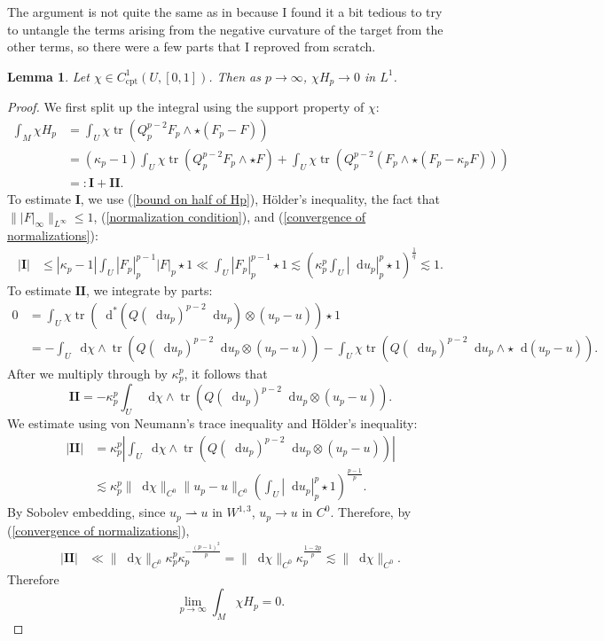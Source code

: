 \documentclass[reqno,11pt]{amsart}
\newcommand*\dif{\mathop{}\!\mathrm{d}}
\DeclareMathOperator{\tr}{tr}
\newcommand{\cpt}{\mathrm{cpt}}
\newtheorem{lemma}[theorem]{Lemma}
\newcommand{\weakto}{\rightharpoonup}
\theoremstyle{definition}
\numberwithin{equation}{section}
\begin{document}
The argument is not quite the same as in \cite[\S7]{daskalopoulos2022analytic} because I found it a bit tedious to try to untangle the terms arising from the negative curvature of the target from the other terms, so there were a few parts that I reproved from scratch.

\begin{lemma}\label{decay of tau}
Let $\chi \in C^1_\cpt(U, [0, 1])$.
Then as $p \to \infty$, $\chi H_p \to 0$ in $L^1$.
\end{lemma}
\begin{proof}
We first split up the integral using the support property of $\chi$:
\begin{align*}
\int_M \chi H_p
&= \int_U \chi \tr(Q_p^{p - 2} F_p \wedge \star(F_p - F)) \\
&= (\kappa_p - 1) \int_U \chi \tr(Q_p^{p - 2} F_p \wedge \star F) + \int_U \chi \tr(Q_p^{p - 2} (F_p \wedge \star (F_p - \kappa_p F))) \\
&=: \mathbf I + \mathbf{II}.
\end{align*}
To estimate $\mathbf I$, we use (\ref{bound on half of Hp}), H\"older's inequality, the fact that $\||F|_\infty\|_{L^\infty} \leq 1$, (\ref{normalization condition}), and (\ref{convergence of normalizations}):
\begin{align*}
|\mathbf I| &\leq |\kappa_p - 1| \int_U |F_p|_p^{p - 1} |F|_p \star 1 \ll \int_U |F_p|_p^{p - 1} \star 1 \lesssim \left(\kappa_p^p \int_U |\dif u_p|_p^p \star 1\right)^{\frac{1}{q}} \lesssim 1.
\end{align*}
To estimate $\mathbf{II}$, we integrate by parts:
\begin{align*}
0 &= \int_U \chi \tr(\dif^*(Q(\dif u_p)^{p - 2} \dif u_p) \otimes (u_p - u)) \star 1 \\
&= -\int_U \dif \chi \wedge \tr(Q(\dif u_p)^{p - 2} \dif u_p \otimes (u_p - u)) - \int_U \chi \tr(Q(\dif u_p)^{p - 2} \dif u_p \wedge \star \dif (u_p - u)).
\end{align*}
After we multiply through by $\kappa_p^p$, it follows that 
$$\mathbf{II} = - \kappa_p^p \int_U \dif \chi \wedge \tr(Q(\dif u_p)^{p - 2} \dif u_p \otimes (u_p - u)).$$
We estimate using von Neumann's trace inequality and H\"older's inequality:
\begin{align*}
|\mathbf{II}| &= \kappa_p^p \left|\int_U \dif \chi \wedge \tr(Q(\dif u_p)^{p - 2} \dif u_p \otimes (u_p - u))\right| \\
&\lesssim \kappa_p^p \|\dif \chi\|_{C^0} \|u_p - u\|_{C^0} \left(\int_U |\dif u_p|_p^p \star 1\right)^{\frac{p - 1}{p}}.
\end{align*}
By Sobolev embedding, since $u_p \weakto u$ in $W^{1, 3}$, $u_p \to u$ in $C^0$.
Therefore, by (\ref{convergence of normalizations}),
\begin{align*}
|\mathbf{II}| &\ll \|\dif \chi\|_{C^0} \kappa_p^p \kappa_p^{-\frac{(p - 1)^2}{p}} = \|\dif \chi\|_{C^0} \kappa_p^{\frac{1 - 2p}{p}} \lesssim \|\dif \chi\|_{C^0}. 
\end{align*}
Therefore
$$\lim_{p \to \infty} \int_M \chi H_p = 0.$$


\end{proof}
\end{document}
